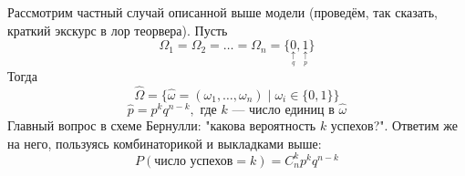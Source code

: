 \documentclass[11pt]{article}
\begin{document}
\begin{example}
    Рассмотрим частный случай описанной выше модели (проведём, так сказать, краткий экскурс в лор теорвера). Пусть
    \[\Omega_1 = \Omega_2 = \ldots = \Omega_n = \{\underset{\underset{q}{\uparrow}}{0}, \underset{\underset{p}{\uparrow}}{1}\}\]
    Тогда
    \[\widehat{\Omega} = \{\widehat{\omega} = (\omega_1, \ldots, \omega_n) \; | \; \omega_i \in \{0, 1\}\}\]
    \[\widehat{p} = p^k q^{n - k}, \text{ где } k \text{ --- число единиц в } \widehat{\omega}\]
    Главный вопрос в схеме Бернулли: "какова вероятность $k$ успехов?". Ответим же на него, пользуясь комбинаторикой и выкладками выше:
    \[P(\text{число успехов} = k) = C_n^k p^k q^{n - k}\]
\end{example}
\end{document}
